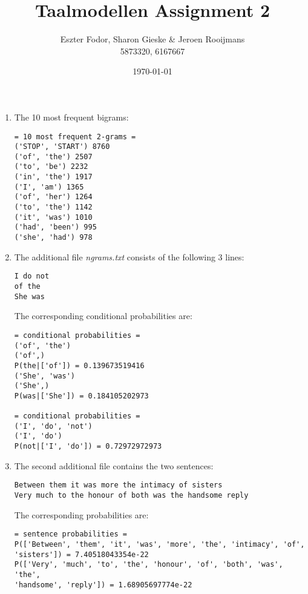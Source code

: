 \documentclass[11pt, a4paper]{article}
\title{Taalmodellen Assignment 2}
\author{Eszter Fodor, Sharon Gieske \& Jeroen Rooijmans \\ 5873320, 6167667}
\date{\today}
\begin{document}
\maketitle

\begin{enumerate}
	\item The 10 most frequent bigrams:
\begin{verbatim}
= 10 most frequent 2-grams =
('STOP', 'START') 8760
('of', 'the') 2507
('to', 'be') 2232
('in', 'the') 1917
('I', 'am') 1365
('of', 'her') 1264
('to', 'the') 1142
('it', 'was') 1010
('had', 'been') 995
('she', 'had') 978
\end{verbatim}

\item The additional file \textit{ngrams.txt} consists of the following 3 lines:
\begin{verbatim}
I do not
of the
She was
\end{verbatim}
The corresponding conditional probabilities are:
\begin{verbatim}
= conditional probabilities =
('of', 'the')
('of',)
P(the|['of']) = 0.139673519416 
('She', 'was')
('She',)
P(was|['She']) = 0.184105202973 

= conditional probabilities =
('I', 'do', 'not')
('I', 'do')
P(not|['I', 'do']) = 0.72972972973
\end{verbatim}
\newpage
\item The second additional file contains the two sentences:
\begin{verbatim}
Between them it was more the intimacy of sisters
Very much to the honour of both was the handsome reply
\end{verbatim}
The corresponding probabilities are:
\begin{verbatim}
= sentence probabilities =
P(['Between', 'them', 'it', 'was', 'more', 'the', 'intimacy', 'of', 
'sisters']) = 7.40518043354e-22 
P(['Very', 'much', 'to', 'the', 'honour', 'of', 'both', 'was', 'the', 
'handsome', 'reply']) = 1.68905697774e-22
\end{verbatim}

\end{enumerate}
\end{document}
